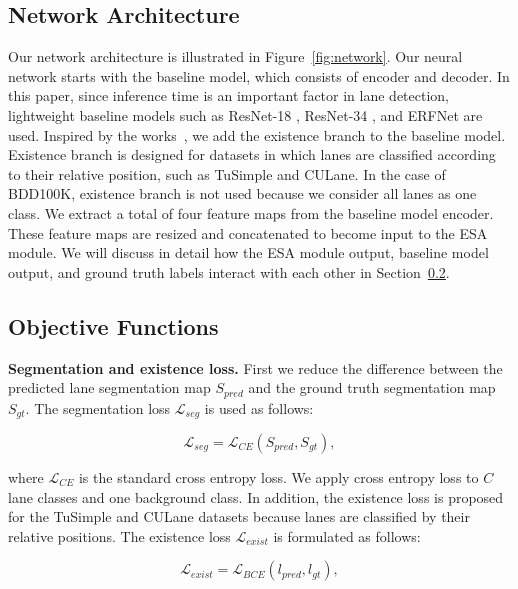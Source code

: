 \documentclass[10pt,twocolumn,letterpaper]{article}
\begin{document}
\subsection{Network Architecture}
Our network architecture is illustrated in Figure~\ref{fig:network}. Our neural network starts with the baseline model, which consists of encoder and decoder. In this paper, since inference time is an important factor in lane detection, lightweight baseline models such as ResNet-18 \cite{he2016deep}, ResNet-34 \cite{he2016deep}, and ERFNet \cite{romera2017erfnet} are used. Inspired by the works~\cite{hou2019learning, liu2020lane}, we add the existence branch to the baseline model. Existence branch is designed for datasets in which lanes are classified according to their relative position, such as TuSimple and CULane. In the case of BDD100K, existence branch is not used because we consider all lanes as one class. We extract a total of four feature maps from the baseline model encoder. These feature maps are resized and concatenated to become input to the ESA module. We will discuss in detail how the ESA module output, baseline model output, and ground truth labels interact with each other in Section~\ref{loss}.

\subsection{Objective Functions}
\label{loss}
\noindent
\textbf{Segmentation and existence loss.} First we reduce the difference between the predicted lane segmentation map $S_{pred}$ and the ground truth segmentation map $S_{gt}$. The segmentation loss $\mathcal{L}_{seg}$ is used as follows:

\begin{equation}
	\mathcal{L}_{seg} = \mathcal{L}_{CE}\left(S_{pred},S_{gt}\right),
	\label{eq:one}
\end{equation}

\noindent
where $\mathcal{L}_{CE}$ is the standard cross entropy loss. We apply cross entropy loss to $C$ lane classes and one background class. In addition, the existence loss is proposed for the TuSimple and CULane datasets because lanes are classified by their relative positions. The existence loss $\mathcal{L}_{exist}$ is formulated as follows:

\begin{equation}
	\mathcal{L}_{exist} = \mathcal{L}_{BCE}\left(l_{pred},l_{gt}\right),
	\label{eq:two}
\end{equation}
\end{document}
